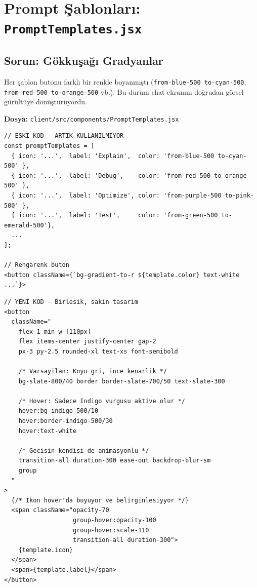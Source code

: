 \documentclass[12pt,a4paper]{article}
\begin{document}
\section{Prompt Şablonları: \texttt{PromptTemplates.jsx}}

\subsection{Sorun: Gökkuşağı Gradyanlar}

Her şablon butonu farklı bir renkle boyanmıştı (\texttt{from-blue-500 to-cyan-500}, \texttt{from-red-500 to-orange-500} vb.). Bu durum chat ekranını doğrudan görsel gürültüye dönüştürüyordu.

\textbf{Dosya:} \texttt{client/src/components/PromptTemplates.jsx}

\begin{lstlisting}[language=JSX, caption={Onceki Hali - Cok Renkli Gradyanlar (Kaldirildi)}]
// ESKI KOD - ARTIK KULLANILMIYOR
const promptTemplates = [
  { icon: '...',  label: 'Explain',  color: 'from-blue-500 to-cyan-500' },
  { icon: '...',  label: 'Debug',    color: 'from-red-500 to-orange-500' },
  { icon: '...',  label: 'Optimize', color: 'from-purple-500 to-pink-500' },
  { icon: '...',  label: 'Test',     color: 'from-green-500 to-emerald-500'},
  ...
];

// Rengarenk buton
<button className={`bg-gradient-to-r ${template.color} text-white ...`}>
\end{lstlisting}

\begin{lstlisting}[language=JSX, caption={Yeni Hali - Sade Slate/Indigo Tasarim - PromptTemplates.jsx:42}]
// YENI KOD - Birlesik, sakin tasarim
<button
  className="
    flex-1 min-w-[110px]
    flex items-center justify-center gap-2
    px-3 py-2.5 rounded-xl text-xs font-semibold

    /* Varsayilan: Koyu gri, ince kenarlik */
    bg-slate-800/40 border border-slate-700/50 text-slate-300

    /* Hover: Sadece Indigo vurgusu aktive olur */
    hover:bg-indigo-500/10
    hover:border-indigo-500/30
    hover:text-white

    /* Gecisin kendisi de animasyonlu */
    transition-all duration-300 ease-out backdrop-blur-sm
    group
  "
>
  {/* Ikon hover'da buyuyor ve belirginlesiyyor */}
  <span className="opacity-70
                   group-hover:opacity-100
                   group-hover:scale-110
                   transition-all duration-300">
    {template.icon}
  </span>
  <span>{template.label}</span>
</button>
\end{lstlisting}
\end{document}
